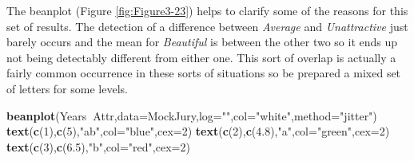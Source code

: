\documentclass[]{book}
\newenvironment{Shaded}{\begin{snugshade}}{\end{snugshade}}
\newcommand{\KeywordTok}[1]{\textcolor[rgb]{0.13,0.29,0.53}{\textbf{#1}}}
\newcommand{\DataTypeTok}[1]{\textcolor[rgb]{0.13,0.29,0.53}{#1}}
\newcommand{\DecValTok}[1]{\textcolor[rgb]{0.00,0.00,0.81}{#1}}
\newcommand{\FloatTok}[1]{\textcolor[rgb]{0.00,0.00,0.81}{#1}}
\newcommand{\StringTok}[1]{\textcolor[rgb]{0.31,0.60,0.02}{#1}}
\newcommand{\OperatorTok}[1]{\textcolor[rgb]{0.81,0.36,0.00}{\textbf{#1}}}
\newcommand{\NormalTok}[1]{#1}
\theoremstyle{definition}
\theoremstyle{definition}
\theoremstyle{remark}
\begin{document}
The beanplot (Figure \ref{fig:Figure3-23}) helps to clarify some of the
reasons for this set of results. The detection of a difference between
\emph{Average} and \emph{Unattractive} just barely occurs and the mean
for \emph{Beautiful} is between the other two so it ends up not being
detectably different from either one. This sort of overlap is actually a
fairly common occurrence in these sorts of situations so be prepared a
mixed set of letters for some levels.







\begin{Shaded}
\begin{Highlighting}[]
\KeywordTok{beanplot}\NormalTok{(Years}\OperatorTok{~}\NormalTok{Attr,}\DataTypeTok{data=}\NormalTok{MockJury,}\DataTypeTok{log=}\StringTok{""}\NormalTok{,}\DataTypeTok{col=}\StringTok{"white"}\NormalTok{,}\DataTypeTok{method=}\StringTok{"jitter"}\NormalTok{)}
\KeywordTok{text}\NormalTok{(}\KeywordTok{c}\NormalTok{(}\DecValTok{1}\NormalTok{),}\KeywordTok{c}\NormalTok{(}\DecValTok{5}\NormalTok{),}\StringTok{"ab"}\NormalTok{,}\DataTypeTok{col=}\StringTok{"blue"}\NormalTok{,}\DataTypeTok{cex=}\DecValTok{2}\NormalTok{)}
\KeywordTok{text}\NormalTok{(}\KeywordTok{c}\NormalTok{(}\DecValTok{2}\NormalTok{),}\KeywordTok{c}\NormalTok{(}\FloatTok{4.8}\NormalTok{),}\StringTok{"a"}\NormalTok{,}\DataTypeTok{col=}\StringTok{"green"}\NormalTok{,}\DataTypeTok{cex=}\DecValTok{2}\NormalTok{)}
\KeywordTok{text}\NormalTok{(}\KeywordTok{c}\NormalTok{(}\DecValTok{3}\NormalTok{),}\KeywordTok{c}\NormalTok{(}\FloatTok{6.5}\NormalTok{),}\StringTok{"b"}\NormalTok{,}\DataTypeTok{col=}\StringTok{"red"}\NormalTok{,}\DataTypeTok{cex=}\DecValTok{2}\NormalTok{)}
\end{Highlighting}
\end{Shaded}
\end{document}
